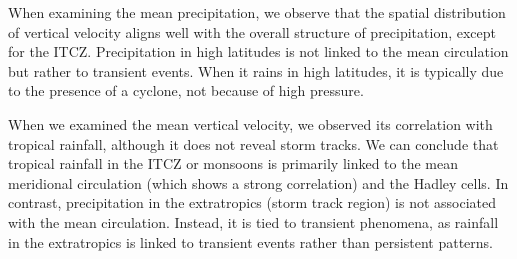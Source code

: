 When examining the mean precipitation, we observe that the spatial distribution of vertical velocity aligns well with the overall structure of precipitation, except for the ITCZ. Precipitation in high latitudes is not linked to the mean circulation but rather to transient events. When it rains in high latitudes, it is typically due to the presence of a cyclone, not because of high pressure.

When we examined the mean vertical velocity, we observed its correlation with tropical rainfall, although it does not reveal storm tracks. We can conclude that tropical rainfall in the ITCZ or monsoons is primarily linked to the mean meridional circulation (which shows a strong correlation) and the Hadley cells. In contrast, precipitation in the extratropics (storm track region) is not associated with the mean circulation. Instead, it is tied to transient phenomena, as rainfall in the extratropics is linked to transient events rather than persistent patterns. 




